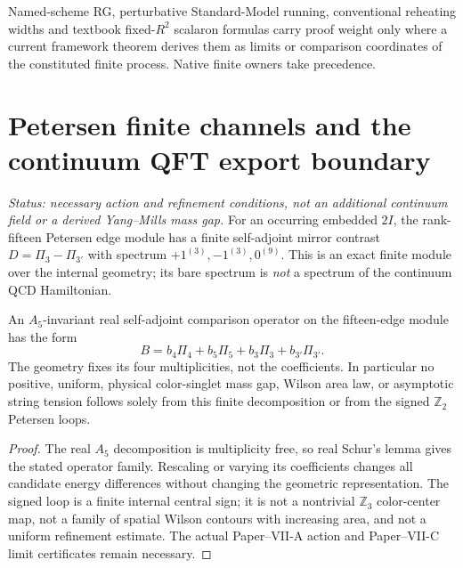 \documentclass[12pt,a4paper]{article}
\begin{document}
\begin{remark}
\label{p12:rem:v2178-framework-native-precedence}
Named-scheme RG, perturbative Standard-Model running, conventional reheating
widths and textbook fixed-$R^2$ scalaron formulas carry proof weight only
where a current framework theorem derives them as limits or comparison
coordinates of the constituted finite process.  Native finite owners take
precedence.
\end{remark}





\setlength{\emergencystretch}{2em}


\section{Petersen finite channels and the continuum QFT export boundary}
\label{p12:sec:v323-petersen-continuum-boundary}
\noindent\textit{Status: necessary action and refinement conditions, not an
additional continuum field or a derived Yang--Mills mass gap.}
For an occurring embedded $2I$, the rank-fifteen Petersen edge module
has a finite self-adjoint mirror contrast
$D=\Pi_3-\Pi_{3'}$ with spectrum $+1^{(3)},-1^{(3)},0^{(9)}$.
This is an exact finite module over the internal geometry; its
bare spectrum is \emph{not} a spectrum of the continuum QCD Hamiltonian.

\begin{proposition}
\label{p12:prop:v323-petersen-no-continuum-gap}
An $A_5$-invariant real self-adjoint comparison operator on the
fifteen-edge module has the form
\[
 B=b_4\Pi_4+b_5\Pi_5+b_3\Pi_3+b_{3'}\Pi_{3'}.
\]
The geometry fixes its four multiplicities, not the coefficients.
In particular no positive, uniform, physical color-singlet mass gap,
Wilson area law, or asymptotic string tension follows solely from this
finite decomposition or from the signed $\mathbb Z_2$ Petersen loops.
\end{proposition}
\begin{proof}
The real $A_5$ decomposition is multiplicity free, so real Schur's
lemma gives the stated operator family.  Rescaling or varying its
coefficients changes all candidate energy differences without changing
the geometric representation.  The signed loop is a finite internal
central sign; it is not a nontrivial $\mathbb Z_3$ color-center map,
not a family of spatial Wilson contours with increasing area, and
not a uniform refinement estimate.  The actual Paper--VII-A action
and Paper--VII-C limit certificates remain necessary.
\end{proof}
\end{document}
